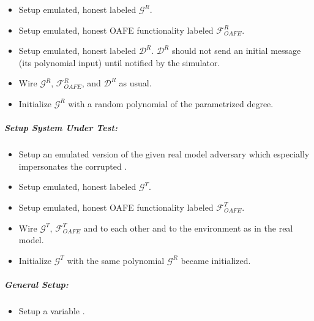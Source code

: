 \begin{itemize}

  \item Setup emulated, honest \JWpOne{} labeled $\mathcal{G}^R$.

  \item Setup emulated, honest OAFE functionality \JWfuncSymOAFE{}
    labeled $\mathcal{F}^R_{OAFE}$.

  \item Setup emulated, honest \JWpTwo{} labeled $\mathcal{D}^R$.
    $\mathcal{D}^R$ should not send an initial message (its polynomial input)
    until notified by the simulator.

  \item Wire $\mathcal{G}^R$, $\mathcal{F}^R_{OAFE}$, and $\mathcal{D}^R$ as
    usual.

  \item Initialize $\mathcal{G}^R$ with a random polynomial of the parametrized
    degree.

\end{itemize}


\subparagraph{Setup System Under Test:}

\begin{itemize}

  \item Setup an emulated version of the given real model adversary
    \JWadv{} which especially impersonates the corrupted \JWpTwo{}.

  \item Setup emulated, honest \JWpOne{} labeled $\mathcal{G}^T$.

  \item Setup emulated, honest OAFE functionality \JWfuncSymOAFE{}
    labeled $\mathcal{F}^T_{OAFE}$.

  \item Wire $\mathcal{G}^T$, $\mathcal{F}^T_{OAFE}$ and \JWadv{} to each other
    and \JWadv{} to the environment as in the real model.

  \item Initialize $\mathcal{G}^T$ with the same polynomial $\mathcal{G}^R$
    became initialized.

\end{itemize}


\subparagraph{General Setup:}

\begin{itemize}

  \item Setup a variable .

\end{itemize}


